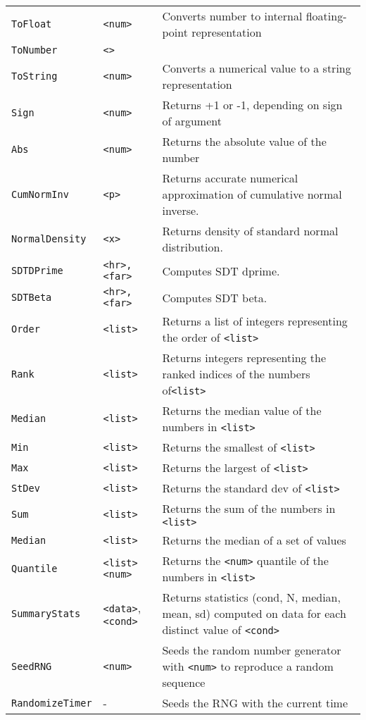\begin{longtable}{p{3cm}p{3cm}p{6cm}}
\verb+ToFloat+ &\verb+<num>+ &Converts number to internal floating-point representation\\ 
\verb+ToNumber+ &\verb+<>+ & \\ 
\verb+ToString+ &\verb+<num>+ &Converts a numerical value to a string representation\\ 
\verb+Sign+ &\verb+<num>+ &Returns +1 or -1, depending on sign of argument\\ 
\verb+Abs+ &\verb+<num>+ &Returns the absolute value of the number\\ 
\verb+CumNormInv+&\verb+<p>+&Returns accurate numerical approximation of cumulative normal inverse.\\
\verb+NormalDensity+&\verb+<x>+&Returns density of standard normal distribution.\\
\verb+SDTDPrime+&\verb+<hr>,<far>+&Computes SDT dprime.\\
\verb+SDTBeta+&\verb+<hr>,<far>+&Computes SDT beta.\\
\verb+Order+ &\verb+<list>+ &Returns a list of integers representing the order of \verb+<list>+\\ 
\verb+Rank+ &\verb+<list>+ &Returns integers representing the ranked indices of the numbers of\verb+<list>+\\ 
\verb+Median+ &\verb+<list>+ &Returns the median value of the numbers in \verb+<list>+\\ 
\verb+Min+ &\verb+<list>+ &Returns the smallest of \verb+<list>+\\ 
\verb+Max+ &\verb+<list>+ &Returns the largest of \verb+<list>+\\ 
\verb+StDev+ &\verb+<list>+ &Returns the standard dev of \verb+<list>+ \\ 
\verb+Sum+ &\verb+<list>+ &Returns the sum of the numbers in \verb+<list>+\\ 
\verb+Median+ &\verb+<list>+ &Returns the median of a set of values \\ 
\verb+Quantile+ &\verb+<list> <num>+ &Returns the \verb+<num>+ quantile of the numbers in \verb+<list>+\\ 
\verb+SummaryStats+ &\verb+<data>+,\verb+<cond>+ &Returns statistics (cond, N, median, mean, sd) computed on data for each distinct value of \verb+<cond>+\\ 
\verb+SeedRNG+ &\verb+<num>+ &Seeds the random number generator with \verb+<num>+ to reproduce a random sequence\\ 
\verb+RandomizeTimer+ & - & Seeds the RNG with the current time\\ 

\end{longtable}
